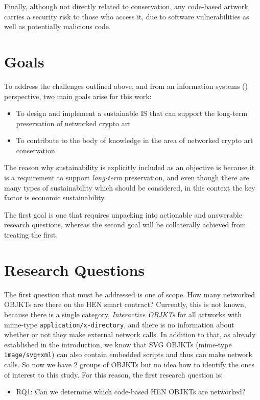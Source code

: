 Finally, although not directly related to conservation, any code-based artwork carries a security risk to those who access it, due to software vulnerabilities as well as potentially malicious code.

\section{Goals}

To address the challenges outlined above, and from an information systems () perspective, two main goals arise for this work:

\begin{itemize}
	\item To design and implement a sustainable IS that can support the long-term preservation of networked crypto art
	\item To contribute to the body of knowledge in the area of networked crypto art conservation
\end{itemize}

The reason why sustainability is explicitly included as an objective is because it is a requirement to support \emph{long-term} preservation, and even though there are many types of sustainability which should be considered, in this context the key factor is economic sustainability.

The first goal is one that requires unpacking into actionable and answerable research questions, whereas the second goal will be collaterally achieved from treating the first.

\section{Research Questions}

The first question that must be addressed is one of scope. How many networked OBJKTs are there on the HEN smart contract? Currently, this is not known, because there is a single category, \emph{Interactive OBJKTs} for all artworks with mime-type \texttt{application/x-directory}, and there is no information about whether or not they make external network calls. In addition to that, as already established in the introduction, we know that SVG OBJKTs (mime-type \texttt{image/svg+xml}) can also contain embedded scripts and thus can make network calls. So now we have 2 groups of OBJKTs but no idea how to identify the ones of interest to this study. For this reason, the first research question is:

\begin{itemize}
	\item RQ1: Can we determine which code-based HEN OBJKTs are networked?
\end{itemize}

